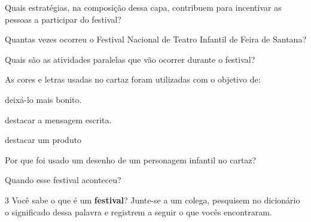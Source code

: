 \begin{escolha}
\item Quais estratégias, na composição dessa capa, contribuem para
incentivar as pessoas a participar do festival?


\item Quantas vezes ocorreu o Festival Nacional de Teatro Infantil de
Feira de Santana?


\item Quais são as atividades paralelas que vão ocorrer durante o festival?


\item As cores e letras usadas no cartaz foram utilizadas com o objetivo de:

\begin{boxlist}
\boxitem[] deixá-lo mais bonito.

\boxitem[\rosa{X}] destacar a mensagem escrita.

\boxitem[] destacar um produto
\end{boxlist}

\item Por que foi usado um desenho de um personagem infantil no cartaz?


\item Quando esse festival aconteceu? 

\end{escolha}

\num{3} Você sabe o que é um \textbf{festival}? Junte-se a um colega,
pesquisem no dicionário o significado dessa palavra e registrem a seguir 
o que vocês encontraram.


